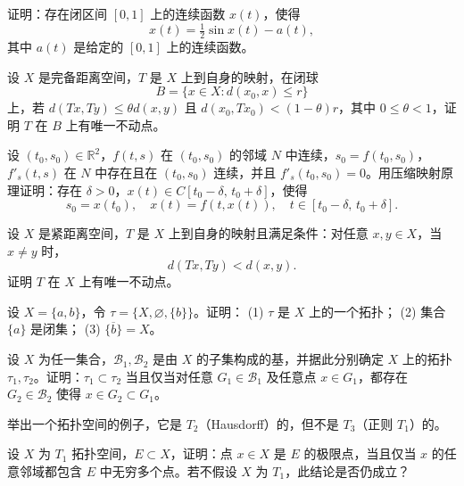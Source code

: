 \begin{exercise}
证明：存在闭区间 $[0,1]$ 上的连续函数 $x(t)$，使得
\[
x(t) = \tfrac{1}{2}\sin x(t) - a(t),
\]
其中 $a(t)$ 是给定的 $[0,1]$ 上的连续函数。
\end{exercise}

\begin{exercise}
设 $X$ 是完备距离空间，$T$ 是 $X$ 上到自身的映射，在闭球
\[
B = \{ x \in X : d(x_0,x) \leq r \}
\]
上，若 $d(Tx,Ty) \leq \theta d(x,y)$ 且 $d(x_0,Tx_0) < (1-\theta)r$，其中 $0 \leq \theta < 1$，证明 $T$ 在 $B$ 上有唯一不动点。
\end{exercise}

\begin{exercise}
设 $(t_0,s_0)\in \mathbb{R}^2$，$f(t,s)$ 在 $(t_0,s_0)$ 的邻域 $N$ 中连续，$s_0=f(t_0,s_0)$，$f'_s(t,s)$ 在 $N$ 中存在且在 $(t_0,s_0)$ 连续，并且 $f'_s(t_0,s_0)=0$。用压缩映射原理证明：存在 $\delta > 0$，$x(t)\in C[t_0-\delta,\,t_0+\delta]$，使得
\[
s_0 = x(t_0), \quad x(t) = f(t,x(t)), \quad t\in [t_0-\delta,\,t_0+\delta].
\]
\end{exercise}

\begin{exercise}
设 $X$ 是紧距离空间，$T$ 是 $X$ 上到自身的映射且满足条件：对任意 $x,y \in X$，当 $x\neq y$ 时，
\[
d(Tx,Ty) < d(x,y).
\]
证明 $T$ 在 $X$ 上有唯一不动点。
\end{exercise}
\begin{exercise}
设 $X=\{a,b\}$，令 $\tau=\{X,\varnothing,\{b\}\}$。证明：
(1) $\tau$ 是 $X$ 上的一个拓扑；
(2) 集合 $\{a\}$ 是闭集；
(3) $\overline{\{b\}}=X$。
\end{exercise}

\begin{exercise}
设 $X$ 为任一集合，$\mathcal{B}_1,\mathcal{B}_2$ 是由 $X$ 的子集构成的基，并据此分别确定 $X$ 上的拓扑 $\tau_1,\tau_2$。证明：$\tau_1\subset\tau_2$ 当且仅当对任意 $G_1\in\mathcal{B}_1$ 及任意点 $x\in G_1$，都存在 $G_2\in\mathcal{B}_2$ 使得 $x\in G_2\subset G_1$。
\end{exercise}

\begin{exercise}
举出一个拓扑空间的例子，它是 $T_2$（Hausdorff）的，但不是 $T_3$（正则 $T_1$）的。
\end{exercise}

\begin{exercise}
设 $X$ 为 $T_1$ 拓扑空间，$E\subset X$，证明：点 $x\in X$ 是 $E$ 的极限点，当且仅当 $x$ 的任意邻域都包含 $E$ 中无穷多个点。若不假设 $X$ 为 $T_1$，此结论是否仍成立？
\end{exercise}

